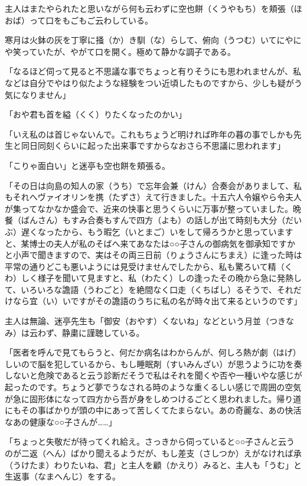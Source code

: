\documentclass{book}
\begin{document}
主人はまたやられたと思いながら何も云わずに空也餅（くうやもち）を頬張（ほおば）って口をもごもご云わしている。

寒月は火鉢の灰を丁寧に掻（か）き馴（な）らして、俯向（うつむ）いてにやにや笑っていたが、やがて口を開く。極めて静かな調子である。

「なるほど伺って見ると不思議な事でちょっと有りそうにも思われませんが、私などは自分でやはり似たような経験をつい近頃したものですから、少しも疑がう気になりません」

「おや君も首を縊（くく）りたくなったのかい」

「いえ私のは首じゃないんで。これもちょうど明ければ昨年の暮の事でしかも先生と同日同刻くらいに起った出来事ですからなおさら不思議に思われます」

「こりゃ面白い」と迷亭も空也餅を頬張る。

「その日は向島の知人の家（うち）で忘年会兼（けん）合奏会がありまして、私もそれへヴァイオリンを携（たずさ）えて行きました。十五六人令嬢やら令夫人が集ってなかなか盛会で、近来の快事と思うくらいに万事が整っていました。晩餐（ばんさん）もすみ合奏もすんで四方（よも）の話しが出て時刻も大分（だいぶ）遅くなったから、もう暇乞（いとまご）いをして帰ろうかと思っていますと、某博士の夫人が私のそばへ来てあなたは○○子さんの御病気を御承知ですかと小声で聞きますので、実はその両三日前（りょうさんにちまえ）に逢った時は平常の通りどこも悪いようには見受けませんでしたから、私も驚ろいて精（くわ）しく様子を聞いて見ますと、私（わたく）しの逢ったその晩から急に発熱して、いろいろな譫語（うわごと）を絶間なく口走（くちばし）るそうで、それだけなら宜（い）いですがその譫語のうちに私の名が時々出て来るというのです」

主人は無論、迷亭先生も「御安（おやす）くないね」などという月並（つきなみ）は云わず、静粛に謹聴している。

「医者を呼んで見てもらうと、何だか病名はわからんが、何しろ熱が劇（はげ）しいので脳を犯しているから、もし睡眠剤（すいみんざい）が思うように功を奏しないと危険であると云う診断だそうで私はそれを聞くや否や一種いやな感じが起ったのです。ちょうど夢でうなされる時のような重くるしい感じで周囲の空気が急に固形体になって四方から吾が身をしめつけるごとく思われました。帰り道にもその事ばかりが頭の中にあって苦しくてたまらない。あの奇麗な、あの快活なあの健康な○○子さんが\ldots{}\ldots{}」

「ちょっと失敬だが待ってくれ給え。さっきから伺っていると○○子さんと云うのが二返（へん）ばかり聞えるようだが、もし差支（さしつか）えがなければ承（うけたま）わりたいね、君」と主人を顧（かえり）みると、主人も「うむ」と生返事（なまへんじ）をする。
\end{document}
